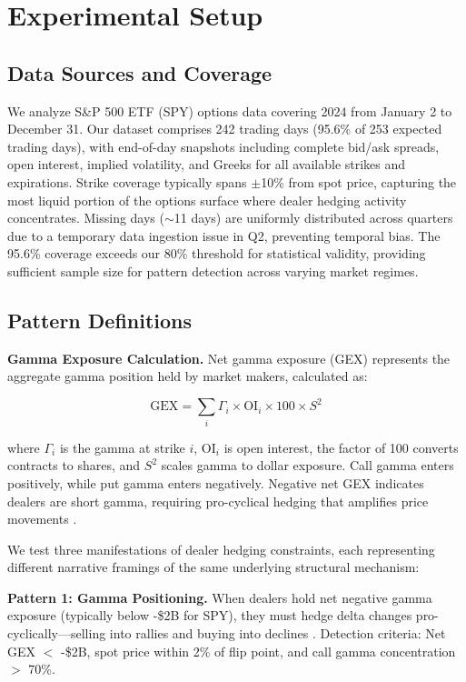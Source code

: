 \section{Experimental Setup}
\label{sec:experimental}

\subsection{Data Sources and Coverage}

We analyze S\&P 500 ETF (SPY) options data covering 2024 from January 2 to December 31. Our dataset comprises 242 trading days (95.6\% of 253 expected trading days), with end-of-day snapshots including complete bid/ask spreads, open interest, implied volatility, and Greeks for all available strikes and expirations. Strike coverage typically spans $\pm$10\% from spot price, capturing the most liquid portion of the options surface where dealer hedging activity concentrates. Missing days ($\sim$11 days) are uniformly distributed across quarters due to a temporary data ingestion issue in Q2, preventing temporal bias. The 95.6\% coverage exceeds our 80\% threshold for statistical validity, providing sufficient sample size for pattern detection across varying market regimes.

\subsection{Pattern Definitions}

\textbf{Gamma Exposure Calculation.} Net gamma exposure (GEX) represents the aggregate gamma position held by market makers, calculated as:

\begin{equation}
\text{GEX} = \sum_{i} \Gamma_i \times \text{OI}_i \times 100 \times S^2
\end{equation}

where $\Gamma_i$ is the gamma at strike $i$, $\text{OI}_i$ is open interest, the factor of 100 converts contracts to shares, and $S^2$ scales gamma to dollar exposure. Call gamma enters positively, while put gamma enters negatively. Negative net GEX indicates dealers are short gamma, requiring pro-cyclical hedging that amplifies price movements \cite{spotgamma2019,spotgamma2021,nomura2017}.

We test three manifestations of dealer hedging constraints, each representing different narrative framings of the same underlying structural mechanism:

\textbf{Pattern 1: Gamma Positioning.} When dealers hold net negative gamma exposure (typically below -\$2B for SPY), they must hedge delta changes pro-cyclically—selling into rallies and buying into declines \cite{garleanu2009demand,nomura2017}. Detection criteria: Net GEX $<$ -\$2B, spot price within 2\% of flip point, and call gamma concentration $>$ 70\%.

